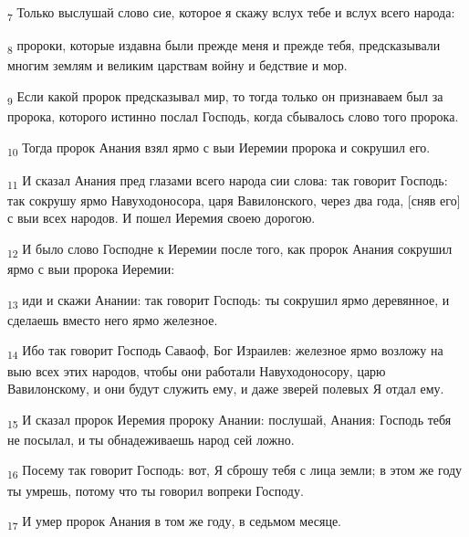 \begin{tcolorbox}
\textsubscript{7} Только выслушай слово сие, которое я скажу вслух тебе и вслух всего народа:
\end{tcolorbox}
\begin{tcolorbox}
\textsubscript{8} пророки, которые издавна были прежде меня и прежде тебя, предсказывали многим землям и великим царствам войну и бедствие и мор.
\end{tcolorbox}
\begin{tcolorbox}
\textsubscript{9} Если какой пророк предсказывал мир, то тогда только он признаваем был за пророка, которого истинно послал Господь, когда сбывалось слово того пророка.
\end{tcolorbox}
\begin{tcolorbox}
\textsubscript{10} Тогда пророк Анания взял ярмо с выи Иеремии пророка и сокрушил его.
\end{tcolorbox}
\begin{tcolorbox}
\textsubscript{11} И сказал Анания пред глазами всего народа сии слова: так говорит Господь: так сокрушу ярмо Навуходоносора, царя Вавилонского, через два года, [сняв его] с выи всех народов. И пошел Иеремия своею дорогою.
\end{tcolorbox}
\begin{tcolorbox}
\textsubscript{12} И было слово Господне к Иеремии после того, как пророк Анания сокрушил ярмо с выи пророка Иеремии:
\end{tcolorbox}
\begin{tcolorbox}
\textsubscript{13} иди и скажи Анании: так говорит Господь: ты сокрушил ярмо деревянное, и сделаешь вместо него ярмо железное.
\end{tcolorbox}
\begin{tcolorbox}
\textsubscript{14} Ибо так говорит Господь Саваоф, Бог Израилев: железное ярмо возложу на выю всех этих народов, чтобы они работали Навуходоносору, царю Вавилонскому, и они будут служить ему, и даже зверей полевых Я отдал ему.
\end{tcolorbox}
\begin{tcolorbox}
\textsubscript{15} И сказал пророк Иеремия пророку Анании: послушай, Анания: Господь тебя не посылал, и ты обнадеживаешь народ сей ложно.
\end{tcolorbox}
\begin{tcolorbox}
\textsubscript{16} Посему так говорит Господь: вот, Я сброшу тебя с лица земли; в этом же году ты умрешь, потому что ты говорил вопреки Господу.
\end{tcolorbox}
\begin{tcolorbox}
\textsubscript{17} И умер пророк Анания в том же году, в седьмом месяце.
\end{tcolorbox}
